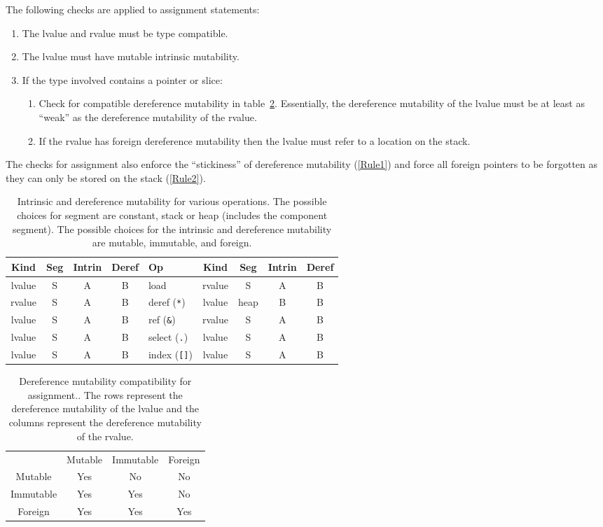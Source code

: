 The following checks are applied to assignment statements:
\begin{enumerate}
\item The lvalue and rvalue must be type compatible.
\item The lvalue must have mutable intrinsic mutability.
\item If the type involved contains a pointer or slice:
  \begin{enumerate}
    \item Check for compatible dereference mutability in table~\ref{assignmut}.
      Essentially, the dereference mutability of the lvalue must be at least as ``weak'' as the dereference mutability of the rvalue\label{Rule1}.
    \item If the rvalue has foreign dereference mutability then the lvalue must refer to a location on the stack\label{Rule2}.
  \end{enumerate}
\end{enumerate}
The checks for assignment also enforce the ``stickiness'' of dereference mutability (\ref{Rule1}) and force all foreign pointers to be forgotten as they can only be stored on the stack (\ref{Rule2}).

\begin{table}
  \centering
  \begin{tabular}{ccccp{1.75cm}cccc}
    Kind & Seg & Intrin & Deref & Op & Kind & Seg & Intrin & Deref \\
    \hline
    lvalue & S & A & B & load              & rvalue & S    & A & B \\
    rvalue & S & A & B & deref (\verb+*+)  & lvalue & heap & B & B \\
    lvalue & S & A & B & ref (\verb+&+)    & rvalue & S    & A & B \\
    lvalue & S & A & B & select (\verb+.+) & lvalue & S    & A & B \\
    lvalue & S & A & B & index (\verb+[]+) & lvalue & S    & A & B \\
  \end{tabular}
  \caption{Intrinsic and dereference mutability for various operations\label{mutability}.  The possible choices for segment are constant, stack or heap (includes the component segment).  The possible choices for the intrinsic and dereference mutability are mutable, immutable, and foreign.}
\end{table}

\begin{table}
  \centering
  \begin{tabular}{cccc}
              & Mutable & Immutable & Foreign \\
    Mutable   & Yes     & No        & No      \\
    Immutable & Yes     & Yes       & No      \\
    Foreign   & Yes     & Yes       & Yes     \\
    \end{tabular}
  \caption{Dereference mutability compatibility for assignment.\label{assignmut}.  The rows represent the dereference mutability of the lvalue and the columns represent the dereference mutability of the rvalue.}
\end{table}

